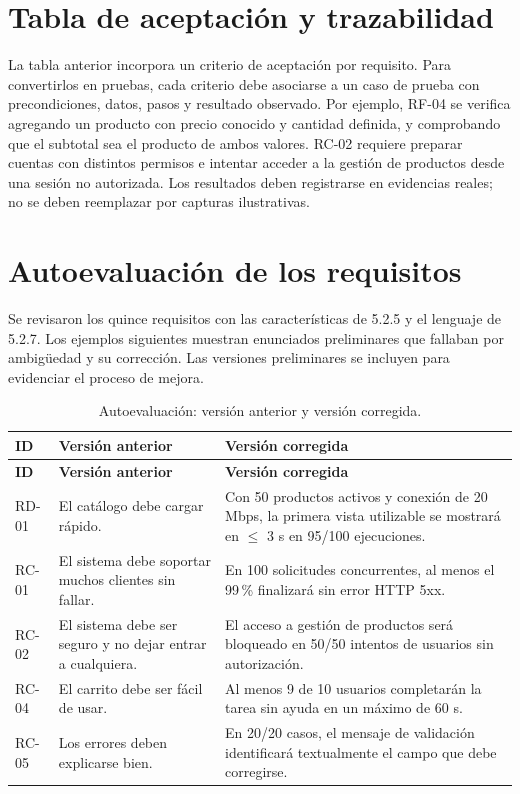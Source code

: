 \documentclass[11pt,a4paper]{article}
\begin{document}
\section{Tabla de aceptación y trazabilidad}
La tabla anterior incorpora un criterio de aceptación por requisito. Para convertirlos en pruebas, cada criterio debe asociarse a un caso de prueba con precondiciones, datos, pasos y resultado observado. Por ejemplo, RF-04 se verifica agregando un producto con precio conocido y cantidad definida, y comprobando que el subtotal sea el producto de ambos valores. RC-02 requiere preparar cuentas con distintos permisos e intentar acceder a la gestión de productos desde una sesión no autorizada. Los resultados deben registrarse en evidencias reales; no se deben reemplazar por capturas ilustrativas.

\section{Autoevaluación de los requisitos}
Se revisaron los quince requisitos con las características de 5.2.5 y el lenguaje de 5.2.7. Los ejemplos siguientes muestran enunciados preliminares que fallaban por ambigüedad y su corrección. Las versiones preliminares se incluyen para evidenciar el proceso de mejora.

\begin{longtable}{@{}L{0.09\textwidth} L{0.34\textwidth} L{0.43\textwidth}@{}}
\caption{Autoevaluación: versión anterior y versión corregida.}\label{tab:autoeval}\\
\toprule
\textbf{ID} & \textbf{Versión anterior} & \textbf{Versión corregida} \\
\midrule
\endfirsthead
\toprule
\textbf{ID} & \textbf{Versión anterior} & \textbf{Versión corregida} \\
\midrule
\endhead
RD-01 & El catálogo debe cargar rápido. & Con 50 productos activos y conexión de 20 Mbps, la primera vista utilizable se mostrará en $\leq$ 3 s en 95/100 ejecuciones. \\
RC-01 & El sistema debe soportar muchos clientes sin fallar. & En 100 solicitudes concurrentes, al menos el 99\,\% finalizará sin error HTTP 5xx. \\
RC-02 & El sistema debe ser seguro y no dejar entrar a cualquiera. & El acceso a gestión de productos será bloqueado en 50/50 intentos de usuarios sin autorización. \\
RC-04 & El carrito debe ser fácil de usar. & Al menos 9 de 10 usuarios completarán la tarea sin ayuda en un máximo de 60 s. \\
RC-05 & Los errores deben explicarse bien. & En 20/20 casos, el mensaje de validación identificará textualmente el campo que debe corregirse. \\
\bottomrule
\end{longtable}
\end{document}
